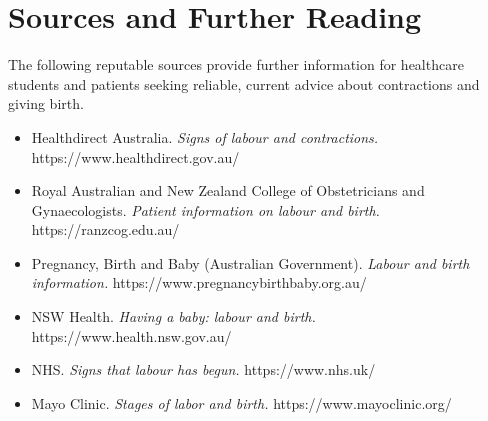 \section*{Sources and Further Reading}
The following reputable sources provide further information for healthcare students and patients seeking reliable, current advice about contractions and giving birth.

\begin{itemize}
    \item Healthdirect Australia. \textit{Signs of labour and contractions.} https://www.healthdirect.gov.au/
    \item Royal Australian and New Zealand College of Obstetricians and Gynaecologists. \textit{Patient information on labour and birth.} https://ranzcog.edu.au/
    \item Pregnancy, Birth and Baby (Australian Government). \textit{Labour and birth information.} https://www.pregnancybirthbaby.org.au/
    \item NSW Health. \textit{Having a baby: labour and birth.} https://www.health.nsw.gov.au/
    \item NHS. \textit{Signs that labour has begun.} https://www.nhs.uk/
    \item Mayo Clinic. \textit{Stages of labor and birth.} https://www.mayoclinic.org/
\end{itemize}
